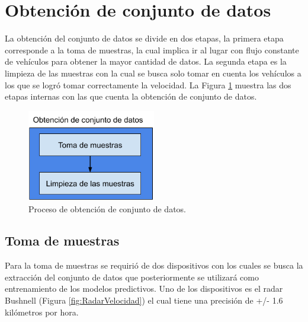 \section{Obtención de conjunto de datos}


La obtención del conjunto de datos se divide en dos etapas, la primera etapa corresponde a la toma de muestras, la cual implica ir al lugar con flujo constante de vehículos para obtener la mayor cantidad de datos. La segunda etapa es la limpieza de las muestras con la cual se busca solo tomar en cuenta los vehículos a los que se logró tomar correctamente la velocidad.
La Figura \ref{fig:DFCreacionCD} muestra las dos etapas internas con las que cuenta la obtención de conjunto de datos.

\begin{figure}[H]
    \centering
    \includegraphics[width=0.5\textwidth]{Metodologia/imgs/ObtencionConjuntoDatos.png}
    \caption{Proceso de obtención de conjunto de datos.}
    \label{fig:DFCreacionCD}
\end{figure}



\subsection{Toma de muestras}

Para la toma de muestras se requirió de dos dispositivos con los cuales se busca la extracción del conjunto de datos que posteriormente se utilizará como entrenamiento de los modelos predictivos. Uno de los dispositivos es el radar Bushnell (Figura \ref{fig:RadarVelocidad}) el cual tiene una precisión de +/- 1.6 kilómetros por hora.


